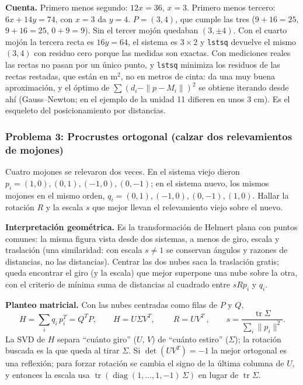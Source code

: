 \textbf{Cuenta.} Primero menos segundo: \(12x=36\), \(x=3\). Primero menos tercero:
\(6x+14y=74\), con \(x=3\) da \(y=4\). \(P=(3,4)\), que cumple las tres
(\(9+16=25\), \(9+16=25\), \(0+9=9\)). Sin el tercer mojón quedaban \((3,\pm4)\). Con el
cuarto mojón la tercera recta es \(16y=64\), el sistema es \(3\times2\) y
\texttt{lstsq} devuelve el mismo \((3,4)\) con residuo cero porque las medidas son
exactas. Con mediciones reales las rectas no pasan por un único punto, y \texttt{lstsq}
minimiza los residuos de las rectas restadas, que están en m\(^2\), no en metros de
cinta: da una muy buena aproximación, y el óptimo de \(\sum(d_i-\|p-M_i\|)^2\) se obtiene
iterando desde ahí (Gauss--Newton; en el ejemplo de la unidad 11 difieren en unos
\(3\) cm). Es el esqueleto del posicionamiento por distancias.

\subsubsection{Problema 3: Procrustes ortogonal (calzar dos relevamientos de mojones)}

\begin{enunciado}[Enunciado]
Cuatro mojones se relevaron dos veces. En el sistema viejo dieron
\(p_i=(1,0),(0,1),(-1,0),(0,-1)\); en el sistema nuevo, los mismos mojones en el mismo
orden, \(q_i=(0,1),(-1,0),(0,-1),(1,0)\). Hallar la rotación \(R\) y la escala \(s\) que
mejor llevan el relevamiento viejo sobre el nuevo.
\end{enunciado}

\textbf{Interpretación geométrica.} Es la transformación de Helmert plana con puntos
comunes: la misma figura vista desde dos sistemas, a menos de giro, escala y traslación (una
similaridad: con escala \(s\neq1\) se conservan ángulos y razones de distancias, no las
distancias). Centrar las dos nubes saca la
traslación gratis; queda encontrar el giro (y la escala) que mejor superpone una nube
sobre la otra, con el criterio de mínima suma de distancias al cuadrado entre
\(sRp_i\) y \(q_i\).

\textbf{Planteo matricial.} Con las nubes centradas como filas de \(P\) y \(Q\),
\[
  H=\sum_i q_i\,p_i^T=Q^TP,\qquad H=U\Sigma V^T,\qquad \boxed{\ R=UV^T\ },\qquad
  s=\frac{\operatorname{tr}\Sigma}{\sum_i\|p_i\|^2}.
\]
La SVD de \(H\) separa ``cuánto giro'' (\(U\), \(V\)) de ``cuánto estiro'' (\(\Sigma\));
la rotación buscada es la que queda al tirar \(\Sigma\). Si \(\det(UV^T)=-1\) la mejor
ortogonal es una reflexión; para forzar rotación se cambia el signo de la última columna
de \(U\), y entonces la escala usa \(\operatorname{tr}(\operatorname{diag}(1,\dots,1,-1)\,\Sigma)\)
en lugar de \(\operatorname{tr}\Sigma\).

